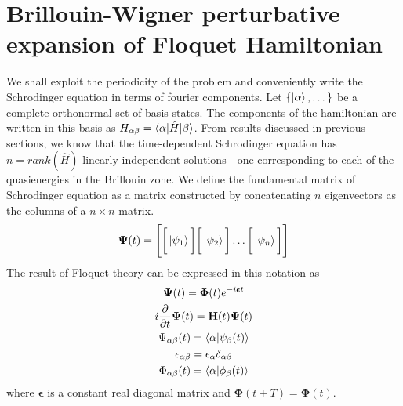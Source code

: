 \section{Brillouin-Wigner perturbative expansion of Floquet Hamiltonian}
We shall exploit the periodicity of the problem and conveniently write the Schrodinger equation in terms of fourier components. Let $\{\ket{\alpha},\dots\}$ be a complete 
orthonormal set of basis states. The components of the hamiltonian are written in this basis as $H_{\alpha\beta}=\braket{\alpha|\hat{H}|\beta}$. From results discussed in
previous sections, we know that the time-dependent Schrodinger equation has $n=rank(\hat{H})$ linearly independent solutions - one corresponding to each of the quasienergies 
in the Brillouin zone. We define the fundamental matrix of Schrodinger equation as a matrix constructed by concatenating $n$ eigenvectors as the columns of a $n \times n$ matrix.
\begin{equation*}
 \bm{\Psi}(t) = \Bigg[ \bigg[\ket{\psi_1}\bigg] \bigg[\ket{\psi_2}\bigg]\dots\bigg[\ket{\psi_n}\bigg] \Bigg]
\end{equation*}
The result of Floquet theory can be expressed in this notation as
\begin{gather}
 \bm{\Psi}(t) = \bm{\Phi}(t) e^{-i\bm{\epsilon} t} \\
 i\frac{\partial}{\partial t} \bm{\Psi}(t) = \mathbf{H}(t)\bm{\Psi}(t) \\
 \Psi_{\alpha\beta}(t) = \braket{\alpha|\psi_{\beta}(t)} \\
 \epsilon_{\alpha\beta} = \epsilon_\alpha \delta_{\alpha\beta} \\
 \Phi_{\alpha\beta}(t) = \braket{\alpha|\phi_{\beta}(t)}
\end{gather}
where $\bm{\epsilon}$ is a constant real diagonal matrix and $\bm{\Phi}(t+T)=\bm{\Phi}(t)$.

